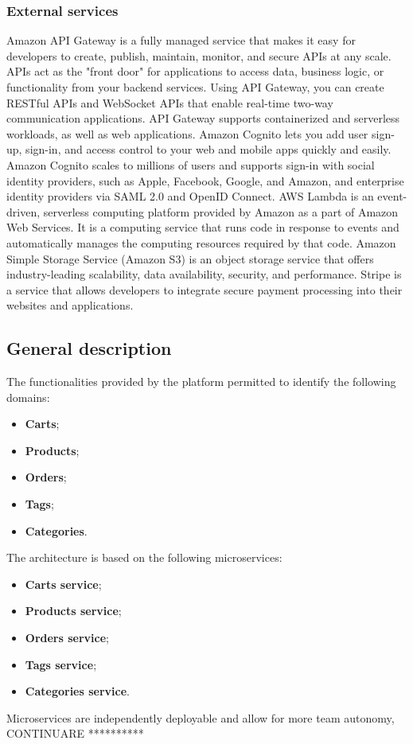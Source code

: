 \subsubsection{External services}
Amazon API Gateway is a fully managed service that makes it easy for developers to create, publish, maintain, monitor,
and secure APIs at any scale. APIs act as the "front door" for applications to access data, business logic,
or functionality from your backend services. Using API Gateway, you can create RESTful APIs and WebSocket APIs that
enable real-time two-way communication applications. API Gateway supports containerized and serverless workloads,
as well as web applications.
Amazon Cognito lets you add user sign-up, sign-in, and access control to your web and mobile apps quickly and easily.
Amazon Cognito scales to millions of users and supports sign-in with social identity providers, such as Apple,
Facebook, Google, and Amazon, and enterprise identity providers via SAML 2.0 and OpenID Connect.
AWS Lambda is an event-driven, serverless computing platform provided by Amazon as a part of Amazon Web Services.
It is a computing service that runs code in response to events and automatically manages the computing resources required by that code.
Amazon Simple Storage Service (Amazon S3) is an object storage service that offers industry-leading scalability,
data availability, security, and performance.
Stripe is a service that allows developers to integrate secure payment processing into their websites and applications.
\subsection{General description}
The functionalities provided by the platform permitted to identify the following domains:
\begin{itemize}
    \item \textbf{Carts};
    \item \textbf{Products};
    \item \textbf{Orders};
    \item \textbf{Tags};
    \item \textbf{Categories}.
\end{itemize}
The architecture is based on the following microservices:
\begin{itemize}
    \item \textbf{Carts service};
    \item \textbf{Products service};
    \item \textbf{Orders service};
    \item \textbf{Tags service};
    \item \textbf{Categories service}.
\end{itemize}
Microservices are independently deployable and allow for more team autonomy, CONTINUARE **********
\pagebreak
